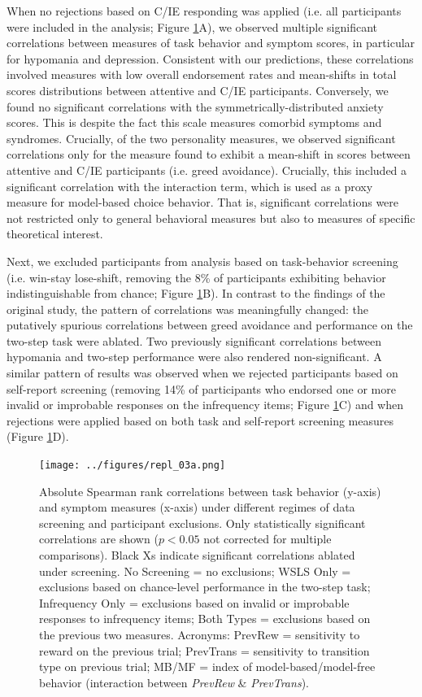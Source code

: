 \documentclass[a4paper,notitlepage,12pt]{article}
\begin{document}
\begin{refsection}[supp]
When no rejections based on C/IE responding was applied (i.e. all participants were included in the analysis; Figure \ref{fig:repl_correlations}A), we observed multiple significant correlations between measures of task behavior and symptom scores, in particular for hypomania and depression. Consistent with our predictions, these correlations involved measures with low overall endorsement rates and mean-shifts in total scores distributions between attentive and C/IE participants. Conversely, we found no significant correlations with the symmetrically-distributed anxiety scores. This is despite the fact this scale measures comorbid symptoms and syndromes. Crucially, of the two personality measures, we observed significant correlations only for the measure found to exhibit a mean-shift in scores between attentive and C/IE participants (i.e. greed avoidance). Crucially, this included a significant correlation with the interaction term, which is used as a proxy measure for model-based choice behavior. That is, significant correlations were not restricted only to general behavioral measures but also to measures of specific theoretical interest.

Next, we excluded participants from analysis based on task-behavior screening (i.e. win-stay lose-shift, removing the 8\% of participants exhibiting behavior indistinguishable from chance; Figure \ref{fig:repl_correlations}B). In contrast to the findings of the original study, the pattern of correlations was meaningfully changed: the putatively spurious correlations between greed avoidance and performance on the two-step task were ablated. Two previously significant correlations between hypomania and two-step performance were also rendered non-significant. A similar pattern of results was observed when we rejected participants based on self-report screening (removing 14\% of participants who endorsed one or more invalid or improbable responses on the infrequency items; Figure \ref{fig:repl_correlations}C) and when rejections were applied based on both task and self-report screening measures (Figure \ref{fig:repl_correlations}D).

\begin{figure}[!t]
\texttt{[image: ../figures/repl\_03a.png]}
\centering
\captionsetup{width=0.88\textwidth}
\caption{Absolute Spearman rank correlations between task behavior (y-axis) and symptom measures (x-axis) under different regimes of data screening and participant exclusions. Only statistically significant correlations are shown ($p<0.05$ not corrected for multiple comparisons). Black Xs indicate significant correlations ablated under screening. No Screening = no exclusions; WSLS Only = exclusions based on chance-level performance in the two-step task; Infrequency Only = exclusions based on invalid or improbable responses to infrequency items; Both Types = exclusions based on the previous two measures. Acronyms: PrevRew = sensitivity to reward on the previous trial; PrevTrans = sensitivity to transition type on previous trial; MB/MF = index of model-based/model-free behavior (interaction between \textit{PrevRew} \& \textit{PrevTrans}).}
\label{fig:repl_correlations}
\end{figure}


\end{refsection}
\end{document}
